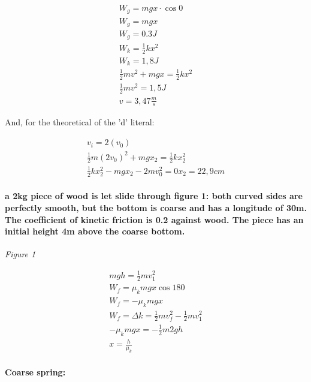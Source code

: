 \documentclass[11pt,fleqn]{book} %
\begin{document}
\begin{gather}
    W_g = mg x \cdot \cos{0}\\
    W_g = mgx \\
    W_g = 0.3J\\
    W_k = \frac{1}{2} k x^2\\
    W_k = 1,8 J\\
    \frac{1}{2} mv^2 + mgx = \frac{1}{2}kx^2\\
    \frac{1}{2}mv^2 = 1,5J\\
    v = 3,47 \frac{m}{s}
\end{gather}

And, for the theoretical of the 'd' literal:

\begin{gather}
    v_i = 2(v_0)\\
    \frac{1}{2}m(2 v_0)^2 + mgx_2 =\frac{1}{2} kx_2^2\\
    \frac{1}{2} k x_2^2 - mgx_2 - 2 mv_0^2 = 0
    x_2 = 22,9 cm
\end{gather}

\paragraph*{a 2kg piece of wood is let slide through figure 1: both curved sides are
perfectly smooth, but the bottom is coarse and has a longitude of 30m. The coefficient of kinetic friction is 
0.2 against wood. The piece has an initial height 4m above the coarse bottom.}

\begin{center}
    \textit{Figure 1}
\end{center}

\begin{gather}
    mgh = \frac{1}{2}mv_1^2\\
    W_f = \mu_k mg x \cos{180}\\
    W_f  = - \mu_k mg x\\
    W_f = \Delta k  = \frac{1}{2} m v_f^2 - \frac{1}{2}mv_1^2 \\
    - \mu_k mg x  = - \frac{1}{2} m2gh \\
    x = \frac{h}{\mu_k}
\end{gather}

\paragraph{Coarse spring:}

\begin{gather}
    \frac{}{}
\end{gather}
\end{document}
